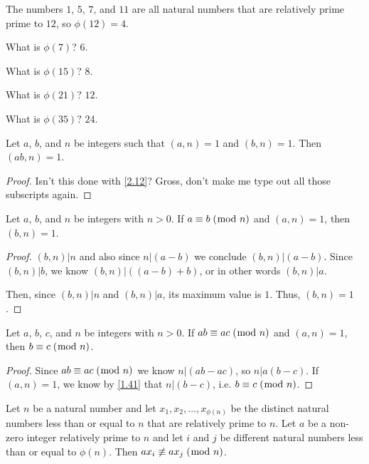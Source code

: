 \documentclass[../main.tex]{subfiles}
\begin{document}
\begin{ques} \label{4.27}
  The numbers $1$, $5$, $7$, and $11$ are all natural numbers that are relatively prime prime to $12$, so $\phi (12) = 4$.
\end{ques}

What is $\phi (7)$? $6$.

What is $\phi (15)$? $8$.

What is $\phi (21)$? $12$.

What is $\phi (35)$? $24$.



\begin{thm} \label{4.28}
  Let $a$, $b$, and $n$ be integers such that $(a, n) = 1$ and $(b, n) = 1$. Then $(ab, n) = 1$.
\end{thm}

\begin{proof}
  Isn't this done with \ref{2.12}? Gross, don't make me type out all those subscripts again.
\end{proof}



\begin{thm} \label{4.29}
  Let $a$, $b$, and $n$ be integers with $n > 0$. If $a \equiv b \; (\bmod \; n)$ and $(a, n) = 1$, then $(b, n) = 1$.
\end{thm}

\begin{proof}
  $(b, n) | n$ and also since $n | (a - b)$ we conclude $(b, n) | (a - b)$. Since $(b, n) | b$, we know $(b, n) | ((a - b) + b)$, or in other words $(b, n) | a$.

  Then, since $(b, n) | n$ and $(b, n) | a$, its maximum value is $1$. Thus, $(b, n) = 1$.
\end{proof}



\begin{thm} \label{4.30}
  Let $a$, $b$, $c$, and $n$ be integers with $n > 0$. If $ab \equiv ac \; (\bmod \; n)$ and $(a, n) = 1$, then $b \equiv c \; (\bmod \; n)$.
\end{thm}

\begin{proof}
  Since $ab \equiv ac \; (\bmod \; n)$ we know $n | (ab - ac)$, so $n | a(b-c)$. If $(a, n) = 1$, we know by \ref{1.41} that $n | (b-c)$, i.e. $b \equiv c \; (\bmod \; n)$.
\end{proof}



\begin{thm} \label{4.31}
  Let $n$ be a natural number and let $x_1, x_2, \ldots, x_{\phi (n)}$ be the distinct natural numbers less than or equal to $n$ that are relatively prime to $n$. Let $a$ be a non-zero integer relatively prime to $n$ and let $i$ and $j$ be different natural numbers less than or equal to $\phi (n)$. Then $ax_i \not \equiv ax_j \; (\bmod \; n)$.
\end{thm}
\end{document}
